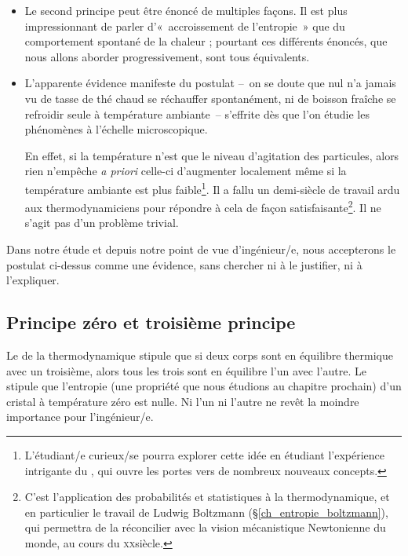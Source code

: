 		\begin{itemize}
			\item Le second principe peut être énoncé de multiples façons. Il est plus impressionnant de parler d’«~accroissement de l’entropie~» que du comportement spontané de la chaleur ; pourtant ces différents énoncés, que nous allons aborder progressivement, sont tous équivalents.
			\item L’apparente évidence manifeste du postulat --\ on se doute que nul n’a jamais vu de tasse de thé chaud se réchauffer spontanément, ni de boisson fraîche se refroidir seule à température ambiante\ -- s’effrite dès que l’on étudie les phénomènes à l’échelle microscopique.

		En effet, si la température n’est que le niveau d’agitation des particules, alors rien n’empêche \textit{a priori} celle-ci d’augmenter localement même si la température ambiante est plus faible\footnote{L’étudiant/e curieux/se pourra explorer cette idée en étudiant l’expérience intrigante du \textit{}, qui ouvre les portes vers de nombreux nouveaux concepts.}. Il a fallu un demi-siècle de travail ardu aux thermodynamiciens pour répondre à cela de façon satisfaisante\footnote{C’est l’application des probabilités et statistiques à la thermodynamique, et en particulier le travail de Ludwig Boltzmann (\S\ref{ch_entropie_boltzmann}), qui permettra de la réconcilier avec la vision mécanistique Newtonienne du monde, au cours du \textsc{xx}\ieme siècle.}. Il ne s’agit pas d’un problème trivial.
		\end{itemize}

		Dans notre étude et depuis notre point de vue d’ingénieur/e, nous accepterons le postulat ci-dessus comme une évidence, sans chercher ni à le justifier, ni à l’expliquer.
		
		
	\subsection{Principe zéro et troisième principe}
	
		Le  de la thermodynamique stipule que si deux corps sont en équilibre thermique avec un troisième, alors tous les trois sont en équilibre l’un avec l’autre. Le  stipule que l’entropie (une propriété que nous étudions au chapitre prochain) d’un cristal à température zéro est nulle. Ni l’un ni l’autre ne revêt la moindre importance pour l’ingénieur/e.



